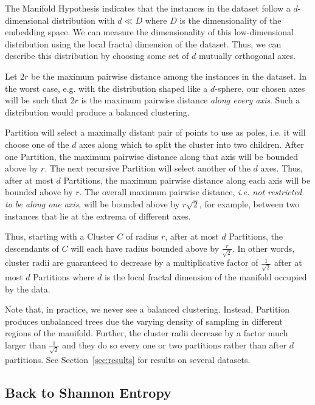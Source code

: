 The Manifold Hypothesis indicates that the instances in the dataset follow a $d$-dimensional distribution with $d \ll D$ where $D$ is the dimensionality of the embedding space.
We can measure the dimensionality of this low-dimensional distribution using the local fractal dimension of the dataset.
Thus, we can describe this distribution by choosing some set of $d$ mutually orthogonal axes.

Let $2r$ be the maximum pairwise distance among the instances in the dataset.
In the worst case, e.g. with the distribution shaped like a $d$-sphere, our chosen axes will be such that $2r$ is the maximum pairwise distance \textit{along every axis}.
Such a distribution would produce a balanced clustering.

Partition will select a maximally distant pair of points to use as poles, i.e. it will choose one of the $d$ axes along which to split the cluster into two children.
After one Partition, the maximum pairwise distance along that axis will be bounded above by $r$.
The next recursive Partition will select another of the $d$ axes.
Thus, after at most $d$ Partitions, the maximum pairwise distance along each axis will be bounded above by $r$.
The overall maximum pairwise distance, \textit{i.e. not restricted to be along one axis}, will be bounded above by $r \sqrt{2}$, for example, between two instances that lie at the extrema of different axes.

Thus, starting with a Cluster $C$ of radius $r$, after at most $d$ Partitions, the descendants of $C$ will each have radius bounded above by $\frac{r}{\sqrt{2}}$.
In other words, cluster radii are guaranteed to decrease by a multiplicative factor of $\frac{1}{\sqrt{2}}$ after at most $d$ Partitions where $d$ is the local fractal dimension of the manifold occupied by the data.

Note that, in practice, we never see a balanced clustering.
Instead, Partition produces unbalanced trees due the varying density of sampling in different regions of the manifold.
Further, the cluster radii decrease by a factor much larger than $\frac{1}{\sqrt{2}}$ and they do so every one or two partitions rather than after $d$ partitions.
See Section~\ref{sec:results} for results on several datasets.


\subsection{Back to Shannon Entropy}
\label{subsec:methods:back-to-shannon-entropy}

